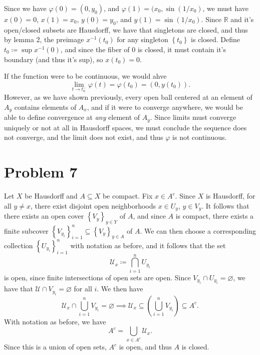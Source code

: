 \documentclass[11pt, letterpaper]{article}
\begin{document}
Since we have $\varphi (0)=(0,y_0)$, and $\varphi (1)=(x_0,\sin (1/x_0)$, we must have $x(0)=0$, $x(1)=x_0$, $y(0)=y_0$, and $y(1)=\sin (1/x_0)$. Since $\mathbb{R} $ and it's open/closed subsets are Hausdorff, we have that singletons are closed, and thus by lemma 2, the preimage $x ^{-1} (t_0)$ for any singleton $\left\{ t_0 \right\} $ is closed. Define $t_0\coloneqq \sup x ^{-1} (0)$, and since the fiber of $0$ is closed, it must contain it's boundary (and thus it's sup), so $x(t_0)=0$.

If the function were to be continuous, we would ahve
\[
	\lim_{t \to t_0^-} \varphi (t)=\varphi (t_0)=(0,y(t_0))
.\]
However, as we have shown previously, every open ball centered at an element of $A_y$ contains elements of $A_x$, and if it were to converge anywhere, we would be able to define convergence at \emph{any} element of $A_y$. Since limits must converge uniquely or not at all in Hausdorff spaces, we must conclude the sequence does not converge, and the limit does not exist, and thus $\varphi $ is not continuous.
\section*{Problem 7}
Let $X$ be Hausdorff and $A\subseteq X$ be compact. Fix $x\in A^{c} $. Since $X$ is Hausdorff, for all $y\neq x$, there exist disjoint open neighborhoods $x\in U_y$, $y\in V_y$. It follows that there exists an open cover $\left\{ V_y \right\}_{y\in Y} $ of $A$, and since $A$ is compact, there exists a finite subcover $\left\{ V_{y_i}  \right\}_{i=1}^n\subseteq \left\{ V_y \right\}_{y\in A} $ of $A$. We can then choose a corresponding collection $\left\{ U_{y_i} \right\}_{i=1} ^n$ with notation as before, and it follows that the set
\[
	\mathcal{U}_x \coloneqq \bigcap_{i=1}^n U_{y_i}
\]
is open, since finite intersections of open sets are open. Since $V_{y_i} \cap U_{y_i} =\varnothing $, we have that $\mathcal{U} \cap V_{y_i} =\varnothing$ for all $i$. We then have
\[
	\mathcal{U}_x \cap \bigcup_{i=1}^n V_{y_i} =\varnothing \implies  \mathcal{U}_x \subseteq \left( \bigcup_{i=1}^n V_{y_i}  \right) \subseteq A^{c} 
.\]
With notation as before, we have
\[
	A^{c} =\bigcup_{x\in A^{c} } \mathcal{U}_x
.\]
Since this is a union of open sets, $A^{c} $ is open, and thus $A$ is closed.
\end{document}
